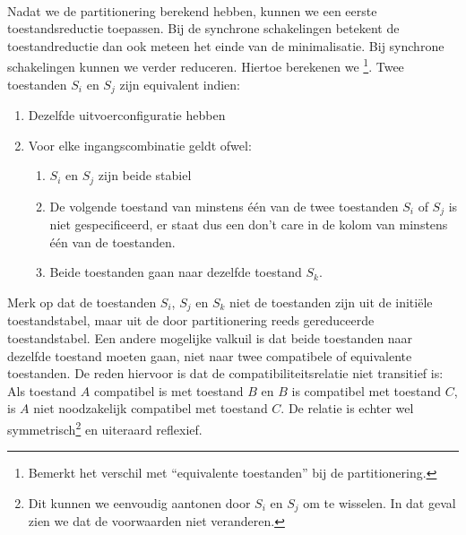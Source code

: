 \paragraph{}
Nadat we de partitionering berekend hebben, kunnen we een eerste toestandsreductie toepassen. Bij de synchrone schakelingen betekent de toestandreductie dan ook meteen het einde van de minimalisatie. Bij synchrone schakelingen kunnen we verder reduceren. Hiertoe berekenen we \footnote{Bemerkt het verschil met ``equivalente toestanden'' bij de partitionering.}. Twee toestanden $S_i$ en $S_j$ zijn equivalent indien:
\begin{enumerate}
 \item Dezelfde uitvoerconfiguratie hebben
 \item Voor elke ingangscombinatie geldt ofwel:
 \begin{enumerate}
  \item $S_i$ en $S_j$ zijn beide stabiel
  \item De volgende toestand van minstens \'e\'en van de twee toestanden $S_i$ of $S_j$ is niet gespecificeerd, er staat dus een don't care in de kolom van minstens \'e\'en van de toestanden.
  \item Beide toestanden gaan naar dezelfde toestand $S_k$.
 \end{enumerate}
\end{enumerate}
Merk op dat de toestanden $S_i$, $S_j$ en $S_k$ niet de toestanden zijn uit de initi\"ele toestandstabel, maar uit de door partitionering reeds gereduceerde toestandstabel. Een andere mogelijke valkuil is dat beide toestanden naar dezelfde toestand moeten gaan, niet naar twee compatibele of equivalente toestanden. De reden hiervoor is dat de compatibiliteitsrelatie niet transitief is: Als toestand $A$ compatibel is met toestand $B$ en $B$ is compatibel met toestand $C$, is $A$ niet noodzakelijk compatibel met toestand $C$. De relatie is echter wel symmetrisch\footnote{Dit kunnen we eenvoudig aantonen door $S_i$ en $S_j$ om te wisselen. In dat geval zien we dat de voorwaarden niet veranderen.} en uiteraard reflexief.
